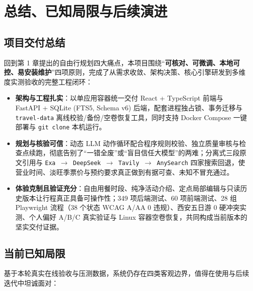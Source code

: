 \section{总结、已知局限与后续演进}

\subsection{项目交付总结}

回到第 1 章提出的自由行规划四大痛点，本项目围绕“\textbf{可核对、可微调、本地可控、易安装维护}”四项原则，完成了从需求收敛、架构决策、核心引擎研发到多维度实测验收的完整工程闭环：

\begin{itemize}
  \item \textbf{架构与工程扎实}：以单应用容器统一交付 React + TypeScript 前端与 FastAPI + SQLite (FTS5, Schema v6) 后端，配套进程独占锁、事务迁移与 \texttt{travel-data} 离线校验/备份/空卷恢复工具，同时支持 Docker Compose 一键部署与 \texttt{git clone} 本机运行。
  \item \textbf{规划与核验可信}：动态 LLM 动作循环配合程序规则校验、独立质量审核与检查点续跑，彻底告别了“一错全废”或“盲目信任大模型”的两难；分离式三段原文引用与 \texttt{Exa $\rightarrow$ DeepSeek $\rightarrow$ Tavily $\rightarrow$ AnySearch} 四家搜索回退，使营业时间、淡旺季票价与预约要求真正做到有据可查、未知不冒充通过。
  \item \textbf{体验克制且验证充分}：自由用餐时段、纯净活动介绍、定点局部编辑与只读历史版本让行程真正具备可操作性；349 项后端测试、60 项前端测试、28 组 Playwright 流程（38 个状态 WCAG A/AA 0 违规）、西安五日游 0 硬冲突实测、个人偏好 A/B/C 真实验证与 Linux 容器空卷恢复，共同构成当前版本的坚实交付证据。
\end{itemize}

\subsection{当前已知局限}

基于本轮真实在线验收与压测数据，系统仍存在四类客观边界，值得在使用与后续迭代中坦诚面对：


